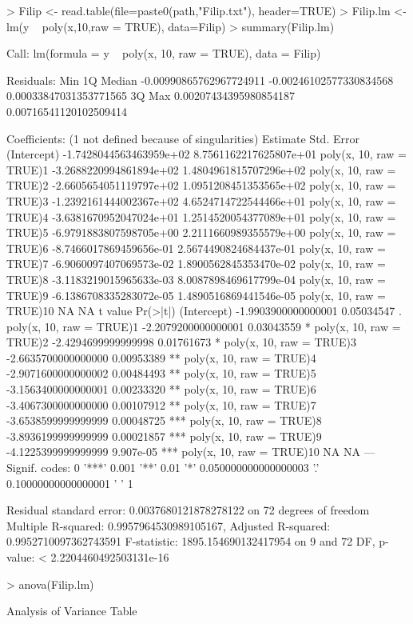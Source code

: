 \documentclass[10pt]{article}
\begin{document}
\begin{Schunk}
\begin{Sinput}
> Filip <- read.table(file=paste0(path,"Filip.txt"), header=TRUE)
> Filip.lm <- lm(y ~ poly(x,10,raw = TRUE), data=Filip)
> summary(Filip.lm)
\end{Sinput}
\begin{Soutput}
Call:
lm(formula = y ~ poly(x, 10, raw = TRUE), data = Filip)

Residuals:
                    Min                      1Q                  Median 
-0.00990865762967724911 -0.00246102577330834568  0.00033847031353771565 
                     3Q                     Max 
 0.00207434395980854187  0.00716541120102509414 

Coefficients: (1 not defined because of singularities)
                                         Estimate              Std. Error
(Intercept)               -1.7428044563463959e+02  8.7561162217625807e+01
poly(x, 10, raw = TRUE)1  -3.2688220994861894e+02  1.4804961815707296e+02
poly(x, 10, raw = TRUE)2  -2.6605654051119797e+02  1.0951208451353565e+02
poly(x, 10, raw = TRUE)3  -1.2392161444002367e+02  4.6524714722544466e+01
poly(x, 10, raw = TRUE)4  -3.6381670952047024e+01  1.2514520054377089e+01
poly(x, 10, raw = TRUE)5  -6.9791883807598705e+00  2.2111660989355579e+00
poly(x, 10, raw = TRUE)6  -8.7466017869459656e-01  2.5674490824684437e-01
poly(x, 10, raw = TRUE)7  -6.9060097407069573e-02  1.8900562845353470e-02
poly(x, 10, raw = TRUE)8  -3.1183219015965633e-03  8.0087898469617799e-04
poly(x, 10, raw = TRUE)9  -6.1386708335283072e-05  1.4890516869441546e-05
poly(x, 10, raw = TRUE)10                      NA                      NA
                                      t value   Pr(>|t|)    
(Intercept)               -1.9903900000000001 0.05034547 .  
poly(x, 10, raw = TRUE)1  -2.2079200000000001 0.03043559 *  
poly(x, 10, raw = TRUE)2  -2.4294699999999998 0.01761673 *  
poly(x, 10, raw = TRUE)3  -2.6635700000000000 0.00953389 ** 
poly(x, 10, raw = TRUE)4  -2.9071600000000002 0.00484493 ** 
poly(x, 10, raw = TRUE)5  -3.1563400000000001 0.00233320 ** 
poly(x, 10, raw = TRUE)6  -3.4067300000000000 0.00107912 ** 
poly(x, 10, raw = TRUE)7  -3.6538599999999999 0.00048725 ***
poly(x, 10, raw = TRUE)8  -3.8936199999999999 0.00021857 ***
poly(x, 10, raw = TRUE)9  -4.1225399999999999  9.907e-05 ***
poly(x, 10, raw = TRUE)10                  NA         NA    
---
Signif. codes:  
0 '***' 0.001 '**' 0.01 '*' 0.050000000000000003 '.' 0.10000000000000001 ' ' 1

Residual standard error: 0.0037680121878278122 on 72 degrees of freedom
Multiple R-squared:  0.9957964530989105167,	Adjusted R-squared:  0.9952710097362743591 
F-statistic: 1895.154690132417954 on 9 and 72 DF,  p-value: < 2.2204460492503131e-16
\end{Soutput}
\begin{Sinput}
> anova(Filip.lm)
\end{Sinput}
\begin{Soutput}
Analysis of Variance Table


\end{Soutput}
\end{Schunk}
\end{document}
